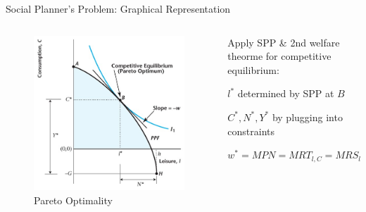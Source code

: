 \documentclass[11pt,aspectratio=169,usenames,dvipsnames]{beamer}
\let\tempone\itemize
\let\temptwo\enditemize
\renewenvironment{itemize}{\tempone\addtolength{\itemsep}{\fill}}{\temptwo}
\begin{document}
\begin{frame}{Social Planner's Problem: Graphical Representation}
\label{slide:Social_Planner_s_Problem__Graphical_Representation}
    \begin{columns}
        \begin{column}{0.5\textwidth}
            \begin{figure}
                \caption{\scriptsize Pareto Optimality}
                \includegraphics[width=.8\textwidth]{./figures/Figure5_4.jpg}
            \end{figure}
        \end{column}
        \begin{column}{0.5\textwidth}
            Apply SPP \& 2nd welfare theorme for competitive equilibrium:
            \begin{itemize}
                \item $ l^{*} $ determined by SPP at $ B $
                \item $ C^{*}, N^{*}, Y^{*} $ by plugging into constraints
                \item $ w^{*} = MPN = MRT_{l, C} = MRS_{l, C} $
            \end{itemize}
        \end{column}
    \end{columns}
\end{frame}
\end{document}
